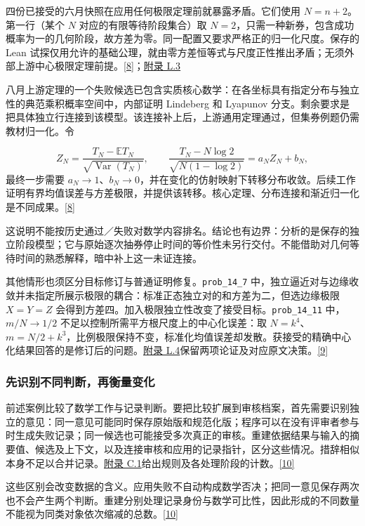 四份已接受的六月快照在应用任何极限定理前就暴露矛盾。它们使用 $N=n+2$。第一行（某个 $N$ 对应的有限等待阶段集合）取 $N=2$，只需一种新券，包含成功概率为一的几何阶段，故方差为零。同一配置又要求严格正的归一化尺度。保存的 Lean 试探仅用允许的基础公理，就由零方差恒等式与尺度正性推出矛盾；无须外部上游中心极限定理前提。\href{zh.pdf\#ref-8}{\mbox{[8]}}；\href{zh-appendix.pdf\#l3}{附录 L.3}

八月上游定理的一个失败候选已包含实质核心数学：在各坐标具有指定分布与独立性的典范乘积概率空间中，内部证明 Lindeberg 和 Lyapunov 分支。剩余要求是把具体独立行连接到该模型。该连接补上后，上游通用定理通过，但集券例题仍需教材归一化。令

\[
Z_N=\frac{T_N-\mathbb E T_N}{\sqrt{\operatorname{Var}(T_N)}},\qquad
\frac{T_N-N\log2}{\sqrt{N(1-\log2)}}=a_N Z_N+b_N,
\]
最终一步需要 $a_N\to1$、$b_N\to0$，并在变化的仿射映射下转移分布收敛。后续工作证明有界均值误差与方差极限，并提供该转移。核心定理、分布连接和渐近归一化是不同成果。\href{zh.pdf\#ref-8}{\mbox{[8]}}

这说明不能按历史通过／失败对数学内容排名。结论也有边界：分析的是保存的独立阶段模型；它与原始逐次抽券停止时间的等价性未另行交付。不能借助对几何等待时间的熟悉解释，暗中补上这一未证连接。

其他情形也须区分目标修订与普通证明修复。\nolinkurl{prob_14_7} 中，独立逼近对与边缘收敛并未指定所展示极限的耦合：标准正态独立对的和方差为二，但选边缘极限 $X=Y=Z$ 会得到方差四。加入极限独立性改变了接受目标。\nolinkurl{prob_14_11} 中，$m/N\to1/2$ 不足以控制所需平方根尺度上的中心化误差：取 $N=k^4$、$m=N/2+k^3$，比例极限保持不变，标准化均值误差却发散。获接受的精确中心化结果回答的是修订后的问题。\href{zh-appendix.pdf\#l4}{附录 L.4}保留两项论证及对应原文决策。\href{zh.pdf\#ref-9}{\mbox{[9]}}

\subsubsection[先识别不同判断，再衡量变化]{\texorpdfstring{\protect\hypertarget{r3-4}{}先识别不同判断，再衡量变化}{先识别不同判断，再衡量变化}}
前述案例比较了数学工作与记录判断。要把比较扩展到审核档案，首先需要识别独立的意见：同一意见可能同时保存原始版和规范化版；程序可以在没有评审者参与时生成失败记录；同一候选也可能接受多次真正的审核。重建依据结果与输入的摘要值、候选及上下文，以及连接审核和应用的记录指针，区分这些情况。措辞相似本身不足以合并记录。\href{zh-appendix.pdf\#c1}{附录 C.1}给出规则及各处理阶段的计数。\href{zh.pdf\#ref-10}{\mbox{[10]}}

这些区别会改变数据的含义。应用失败不自动构成数学否决；把同一意见保存两次也不会产生两个判断。重建分别处理记录身份与数学可比性，因此形成的不同数量不能视为同类对象依次缩减的总数。\href{zh.pdf\#ref-10}{\mbox{[10]}}

